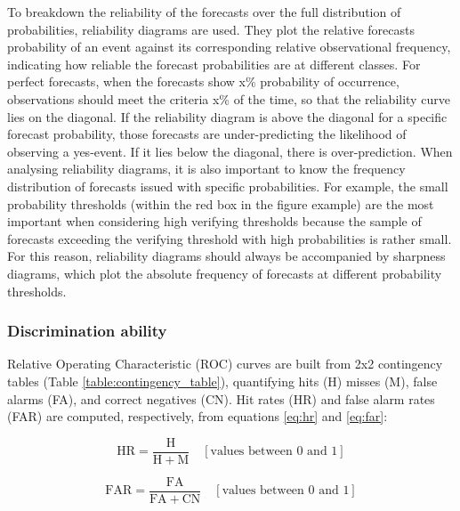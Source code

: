 To breakdown the reliability of the forecasts over the full distribution of probabilities, reliability diagrams are used. They plot the relative forecasts probability of an event against its corresponding relative observational frequency, indicating how reliable the forecast probabilities are at different classes. For perfect forecasts, when the forecasts show x\% probability of occurrence, observations should meet the criteria x\% of the time, so that the reliability curve lies on the diagonal. If the reliability diagram is above the diagonal for a specific forecast probability, those forecasts are under-predicting the likelihood of observing a yes-event. If it lies below the diagonal, there is over-prediction. When analysing reliability diagrams, it is also important to know the frequency distribution of forecasts issued with specific probabilities. For example, the small probability thresholds (within the red box in the figure example) are the most important when considering high verifying thresholds because the sample of forecasts exceeding the verifying threshold with high probabilities is rather small. For this reason, reliability diagrams should always be accompanied by sharpness diagrams, which plot the absolute frequency of forecasts at different probability thresholds. 


\subsubsection{Discrimination ability}

Relative Operating Characteristic (ROC) curves are built from 2x2 contingency tables (Table \ref{table:contingency_table}), quantifying hits (H) misses (M), false alarms (FA), and correct negatives (CN). Hit rates (HR) and false alarm rates (FAR) are computed, respectively, from equations \ref{eq:hr} and \ref{eq:far}:

\begin{equation}
\mathrm{HR} = \frac{\mathrm{H}}{\mathrm{H} + \mathrm{M}}\quad[\text{values between }0\text{ and }1]
\label{eq:hr}
\end{equation}

\begin{equation}
\mathrm{FAR} = \frac{\mathrm{FA}}{\mathrm{FA} + \mathrm{CN}}\quad[\text{values between }0\text{ and }1]
\label{eq:far}
\end{equation}

